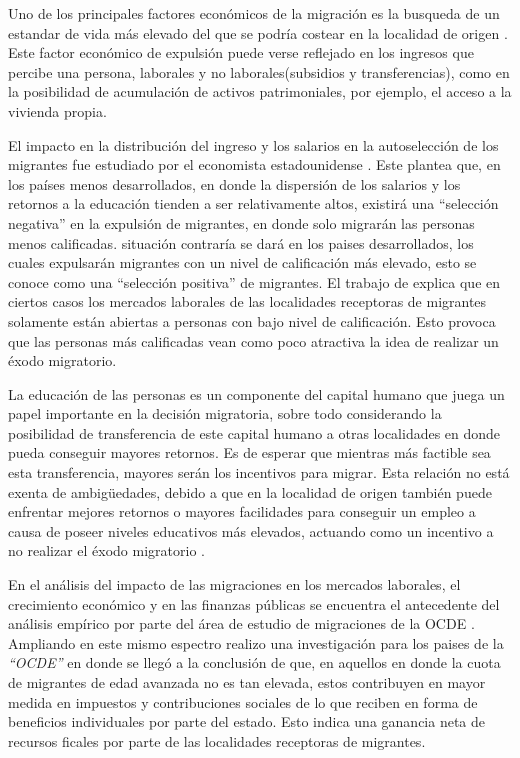 \documentclass[12pt,a4paper]{article}
\begin{document}
Uno de los principales factores económicos de la migración es la busqueda de un estandar de vida más elevado del que se podría costear en la localidad de origen \parencite{simpson_demographic_2017}. Este factor económico de expulsión  puede verse reflejado en los ingresos que percibe una persona, laborales y no laborales(subsidios y transferencias), como en la posibilidad de acumulación de activos patrimoniales, por ejemplo, el acceso a la vivienda propia. 

El impacto en la distribución del ingreso y los salarios en la autoselección de los migrantes fue estudiado por el economista estadounidense \textcite{borjas_self-selection_1987}. Este plantea que, en los países menos desarrollados, en donde la dispersión de los salarios y los retornos a la educación tienden a ser relativamente altos, existirá una ``selección negativa'' en la expulsión de migrantes, en donde solo migrarán las personas menos calificadas. situación contraría se dará en los paises desarrollados, los cuales expulsarán migrantes con un nivel de calificación más elevado, esto se conoce como una ``selección positiva'' de migrantes. El trabajo de \textcite{stark_migration_1991} explica que en ciertos casos los mercados laborales de las localidades receptoras de migrantes solamente están abiertas a personas con bajo nivel de calificación. Esto provoca que las personas más calificadas vean como poco atractiva la idea de realizar un éxodo migratorio.

La educación de las personas es un componente del capital humano que juega un  papel importante en la decisión migratoria, sobre todo considerando la posibilidad de transferencia de este capital humano a otras localidades en donde pueda conseguir mayores retornos. Es de esperar que mientras más factible sea esta transferencia, mayores serán los incentivos para migrar. Esta relación no está exenta de ambigüedades, debido a que en la localidad de origen también puede enfrentar mejores retornos o mayores facilidades para conseguir un empleo a causa de poseer niveles educativos más elevados, actuando como un incentivo a no realizar el éxodo migratorio \parencite{danzer_economic_2008}.

En el análisis del impacto de las migraciones en los mercados laborales, el crecimiento económico y en las finanzas públicas se encuentra el antecedente del análisis empírico por parte del área de estudio de migraciones de la OCDE \textcite{dumont_is_2014}. Ampliando en este mismo espectro \textcite{liebig_fiscal_2013} realizo una investigación para los paises de la \textit{``OCDE''} en donde se llegó a la conclusión de que, en aquellos en donde la cuota de migrantes de edad avanzada no es tan elevada, estos contribuyen en mayor medida en impuestos y contribuciones sociales de lo que reciben en forma de beneficios individuales por parte del estado. Esto indica una ganancia neta de recursos ficales por parte de las localidades receptoras de migrantes.
\end{document}
